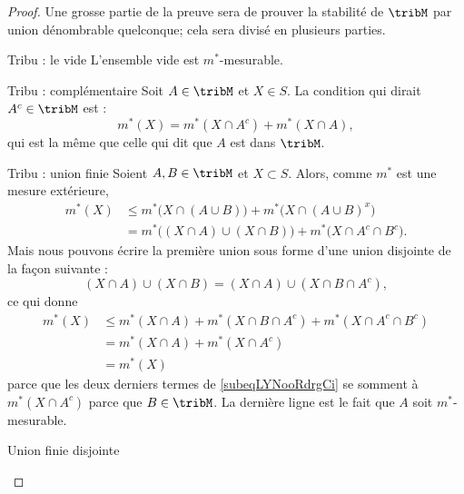 \begin{proof}
    Une grosse partie de la preuve sera de prouver la stabilité de \( \tribM\) par union dénombrable quelconque; cela sera divisé en plusieurs parties.
    \begin{subproof}
    \item[Tribu : le vide]
        L'ensemble vide est \( m^*\)-mesurable.
    \item[Tribu : complémentaire]
        Soit \( A\in\tribM\) et \( X\in S\). La condition qui dirait \( A^c\in\tribM\) est :
        \begin{equation}
            m^*(X)=m^*(X\cap A^c)+m^*(X\cap A),
        \end{equation}
        qui est la même que celle qui dit que \( A\) est dans \( \tribM\).
    \item[Tribu : union finie]
        Soient \( A,B\in\tribM\) et \( X\subset S\). Alors, comme \( m^*\) est une mesure extérieure,
        \begin{subequations}
            \begin{align}
                m^*(X)  & \leq m^*\big(  X\cap(A\cup B) \big)+m^*\big( X\cap (A\cup B)^x \big)      \\
                        & =    m^*\big( (X\cap A)\cup(X\cap B) \big)+m^*\big( X\cap A^c\cap B^c \big).
            \end{align}
        \end{subequations}
        Mais nous pouvons écrire la première union sous forme d'une union disjointe de la façon suivante :
        \begin{equation}
            (X\cap A)\cup(X\cap B)=(X\cap A)\cup(X\cap B\cap A^c),
        \end{equation}
        ce qui donne
        \begin{subequations}
            \begin{align}
                m^*(X)  & \leq m^*(X\cap A)+m^*(X\cap B\cap A^c)+m^*(X\cap A^c\cap B^c)   \label{subeqLYNooRdrgCi}      \\
                        & =    m^*(X\cap A)+m^*(X\cap A^c)            \\
                        & =    m^*(X)
            \end{align}
        \end{subequations}
        parce que les deux derniers termes de \eqref{subeqLYNooRdrgCi} se somment à \( m^*(X\cap A^c)\) parce que \( B\in \tribM\). La dernière ligne est le fait que \( A\) soit \( m^*\)-mesurable.
    \item[Union finie disjointe]

\end{subproof}
\end{proof}
